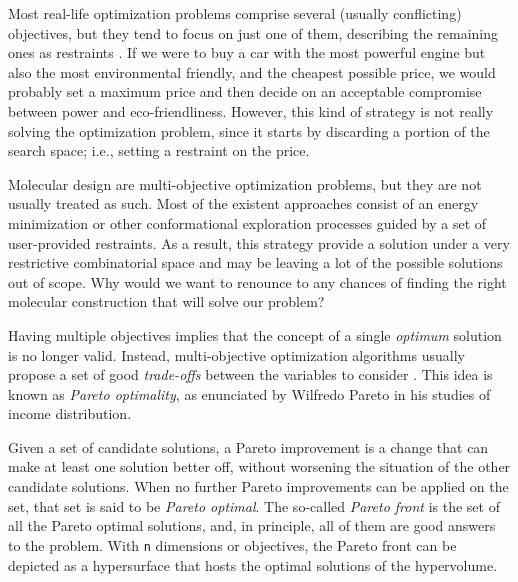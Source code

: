 Most real-life optimization problems comprise several (usually conflicting) objectives, but they tend to focus on just one of them, describing the remaining ones as restraints . If we were to buy a car with the most powerful engine but also the most environmental friendly, and the cheapest possible price, we would probably set a maximum price and then decide on an acceptable compromise between power and eco-friendliness. However, this kind of strategy is not really solving the optimization problem, since it starts by discarding a portion of the search space; i.e., setting a restraint on the price.

Molecular design are multi-objective optimization problems, but they are not usually treated as such. Most of the existent approaches consist of an energy minimization or other conformational exploration processes guided by a set of user-provided restraints. As a result, this strategy provide a solution under a very restrictive combinatorial space and may be leaving a lot of the possible solutions out of scope. Why would we want to renounce to any chances of finding the right molecular construction that will solve our problem?

Having multiple objectives implies that the concept of a single \emph{optimum} solution is no longer valid. Instead, multi-objective optimization algorithms usually propose a set of good \emph{trade-offs} between the  variables to consider . This idea is known as \emph{Pareto optimality}, as enunciated by Wilfredo Pareto in his studies of income distribution.

Given a set of candidate solutions, a Pareto improvement is a change that can make at least one solution better off, without worsening the situation of the other candidate solutions. When no further Pareto improvements can be applied on the set, that set is said to be \emph{Pareto optimal}. The so-called \emph{Pareto front} is the set of all the Pareto optimal solutions, and, in principle, all of them are good answers to the problem. With \texttt{n} dimensions or objectives, the Pareto front can be depicted as a hypersurface that hosts the optimal solutions of the hypervolume.


